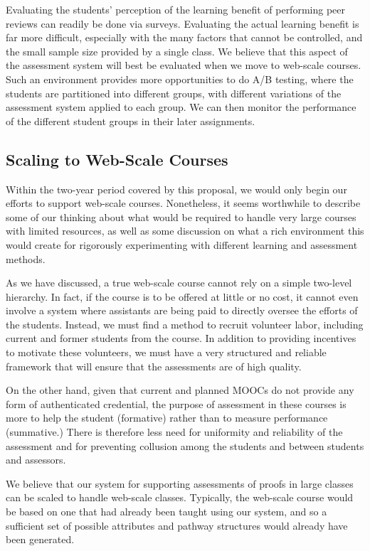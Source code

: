 \documentclass[12pt]{article}
\begin{document}
Evaluating the students' perception of the learning benefit of
performing peer reviews can readily be done via surveys.  Evaluating
the actual learning benefit is far more difficult, especially with the
many factors that cannot be controlled, and the small sample size
provided by a single class.  We believe that this aspect of
the assessment system will best be evaluated when we move to
web-scale courses.  Such an environment provides more opportunities to
do A/B testing, where the students are partitioned into different
groups, with different variations of the assessment system applied to
each group.  We can then monitor the performance of the different
student groups in their later assignments.

\subsection{Scaling to Web-Scale Courses}

Within the two-year period covered by this proposal, we would only
begin our efforts to support web-scale courses.  Nonetheless, it seems
worthwhile to describe some of our thinking about what would be
required to handle very large courses with limited resources, as well
as some discussion on what a rich environment this would create for
rigorously experimenting with different learning and assessment methods.

As we have discussed, a true web-scale course cannot rely on a simple
two-level hierarchy.  In fact, if the course is to be offered at
little or no cost, it cannot even involve a system where assistants
are being paid to directly oversee the efforts of the students.
Instead, we must find a method to recruit volunteer labor, including
current and former students from the course.  In addition to providing
incentives to motivate these volunteers, we must have a very
structured and reliable framework that will ensure that the
assessments are of high quality.

On the other hand, given that current and planned MOOCs do not provide
any form of authenticated credential, the purpose of assessment in
these courses is more to help the student (formative) rather than to
measure performance (summative.)  There is therefore less need for
uniformity and reliability of the assessment and for preventing
collusion among the students and between students and assessors.

We believe that our system for supporting assessments of proofs in
large classes can be scaled to handle web-scale classes.  Typically,
the web-scale course would be based on one that had already been
taught using our system, and so a sufficient set of possible attributes and
pathway structures would already have been generated.
\end{document}

